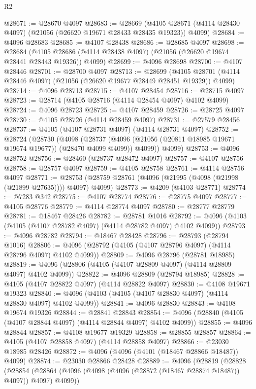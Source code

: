 \begin{lexlean}{R2}
\begin{coremodule}
@28671 := @28670 @4097
@28683 := @28669
    (@4105 @28671 (@4114 @28430 @4097) (@21056 (@26620 @19671 @28433 @28435 @19323)) @4099)
@28684 := @4096 @28683
@28685 := @4107 @28438
@28686 := @28685 @4097
@28698 := @28684
    (@4105 @28686 (@4114 @28438 @4097) (@21056 (@26620 @19674 @28441 @28443 @19326)) @4099)
@28699 := @4096 @28698
@28700 := @4107 @28446
@28701 := @28700 @4097
@28713 := @28699
    (@4105 @28701 (@4114 @28446 @4097) (@21056 (@26620 @19677 @28449 @28451 @19329)) @4099)
@28714 := @4096 @28713
@28715 := @4107 @28454
@28716 := @28715 @4097
@28723 := @28714 (@4105 @28716 (@4114 @28454 @4097) @4102 @4099)
@28724 := @4096 @28723
@28725 := @4107 @28459
@28726 := @28725 @4097
@28730 := @4105 @28726 (@4114 @28459 @4097)
@28731 := @27579 @28456
@28737 := @4105 (@4107 @28731 @4097) (@4114 @28731 @4097)
@28752 := @28724
    (@28730
      (@4098
        (@28737 (@4096 (@21056 (@20811 @18985 @19671 @19674 @19677)) (@28470 @4099 @4099)) @4099))
      @4099)
@28753 := @4096 @28752
@28756 := @28460 (@28737 @28472 @4097)
@28757 := @4107 @28756
@28758 := @28757 @4097
@28759 := @4105 @28758
@28761 := @4114 @28756 @4097
@28771 := @28753 (@28759 @28761 (@4096 (@21995 (@4098 (@21998 (@21899 @27635)))) @4097) @4099)
@28773 := @4209 (@4103 @28771)
@28774 := @7283 @342
@28775 := @4107 @28774
@28776 := @28775 @4097
@28777 := @4105 @28776
@28779 := @4114 @28774 @4097
@28780 := @28777 @28779
@28781 := @18467 @28426
@28782 := @28781 @1016
@28792 := @4096 (@4103 (@4105 (@4107 @28782 @4097) (@4114 @28782 @4097) @4102 @4099))
@28793 := @4096 @28782
@28794 := @18467 @28428
@28796 := @28793 (@28794 @1016)
@28806 := @4096 (@28792 (@4105 (@4107 @28796 @4097) (@4114 @28796 @4097) @4102 @4099))
@28809 := @4096 @28796 (@28781 @18985)
@28819 := @4096 (@28806 (@4105 (@4107 @28809 @4097) (@4114 @28809 @4097) @4102 @4099))
@28822 := @4096 @28809 (@28794 @18985)
@28828 := @4105 (@4107 @28822 @4097) (@4114 @28822 @4097)
@28830 := @4108 @19671 @19323
@28840 := @4096 (@4103 (@4105 (@4107 @28830 @4097) (@4114 @28830 @4097) @4102 @4099))
@28841 := @4096 @28830
@28843 := @4108 @19674 @19326
@28844 := @28841 @28843
@28854 := @4096 (@28840 (@4105 (@4107 @28844 @4097) (@4114 @28844 @4097) @4102 @4099))
@28855 := @4096 @28844
@28857 := @4108 @19677 @19329
@28858 := @28855 @28857
@28864 := @4105 (@4107 @28858 @4097) (@4114 @28858 @4097)
@28866 := @23030 @18985 @28426
@28872 := @4096 (@4096 (@4101 (@18467 @28866 @18487)) @4099)
@28874 := @23030 @28866 @28428
@28889 := @4096
    (@28819
      (@28828
        (@28854 (@28864 (@4096 (@4098 (@4096 (@28872 (@18467 @28874 @18487)) @4097)) @4097) @4099))

\end{coremodule}
\end{lexlean}
